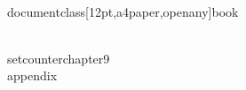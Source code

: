 \\documentclass[12pt,a4paper,openany]{book}
\begin{document}
\\setcounter{chapter}{9}
\
\\appendix
\
\
\
\end{document}
